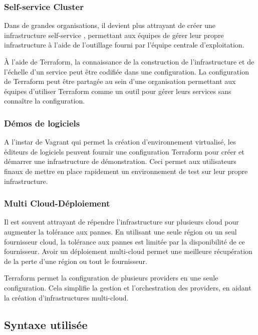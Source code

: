 \documentclass[]{article}
\begin{document}
\subsubsection{Self-service Cluster}\label{self-service-cluster}

Dans de grandes organisations, il devient plus attrayant de créer une
infrastructure \og self-service \fg,
permettant aux équipes de gérer leur propre infrastructure à l'aide de
l'outillage fourni par l'équipe centrale d'exploitation.

À l'aide de Terraform, la connaissance de la construction de
l'infrastructure et de l'échelle d'un service peut être codifiée dans
une configuration. La configuration de Terraform peut être partagée au
sein d'une organisation permettant aux équipes d'utiliser Terraform
comme un outil pour gérer leurs services sans connaître la
configuration.

\subsubsection{Démos de logiciels}\label{duxe9mos-de-logiciels}

A l'instar de Vagrant qui permet la création d'environnement virtualisé,
les éditeurs de logiciels peuvent fournir une configuration Terraform
pour créer et démarrer une infrastructure de démonstration. Ceci permet
aux utilisateurs finaux de mettre en place rapidement un environnement
de test sur leur propre infrastructure.

\subsubsection{Multi
Cloud-Déploiement}\label{multi-cloud-duxe9ploiement}

Il est souvent attrayant de répendre l'infrastructure sur plusieurs
cloud pour augmenter la tolérance aux pannes. En utilisant une seule
région ou un seul fournisseur cloud, la tolérance aux pannes est
limitée par la disponibilité de ce fournisseur. Avoir un déploiement
multi-cloud permet une meilleure récupération de la perte d'une région
ou tout le fournisseur.

Terraform permet la configuration de plusieurs providers en une seule
configuration. Cela simplifie la gestion et l'orchestration des
providers, en aidant la création d'infrastructures multi-cloud.

\subsection{Syntaxe utilisée}\label{syntaxe-utilisuxe9}
\end{document}
